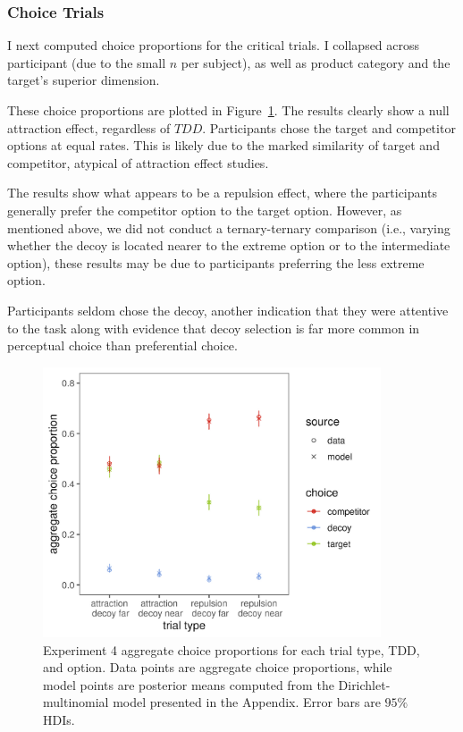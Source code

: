 \subsubsection{Choice Trials}

I next computed choice proportions for the critical trials. I collapsed across participant (due to the small $n$ per subject), as well as product category and the target's superior dimension.

These choice proportions are plotted in Figure~\ref{fig:bayes_choice_model_data_plot}. The results clearly show a null attraction effect, regardless of $TDD$. Participants chose the target and competitor options at equal rates. This is likely due to the marked similarity of target and competitor, atypical of attraction effect studies. 

The results show what appears to be a repulsion effect, where the participants generally prefer the competitor option to the target option. However, as mentioned above, we did not conduct a ternary-ternary comparison (i.e., varying whether the decoy is located nearer to the extreme option or to the intermediate option), these results may be due to participants preferring the less extreme option.

Participants seldom chose the decoy, another indication that they were attentive to the task along with evidence that decoy selection is far more common in perceptual choice than preferential choice.

\begin{figure}
    \includegraphics[scale=.5,width=100mm]{figures/bayes_choice_model_data_plot.jpeg}
    \caption{Experiment 4 aggregate choice proportions for each trial type, TDD, and option. Data points are aggregate choice proportions, while model points are posterior means computed from the Dirichlet-multinomial model presented in the Appendix. Error bars are $95\%$ HDIs.}
    \label{fig:bayes_choice_model_data_plot}
\end{figure}

